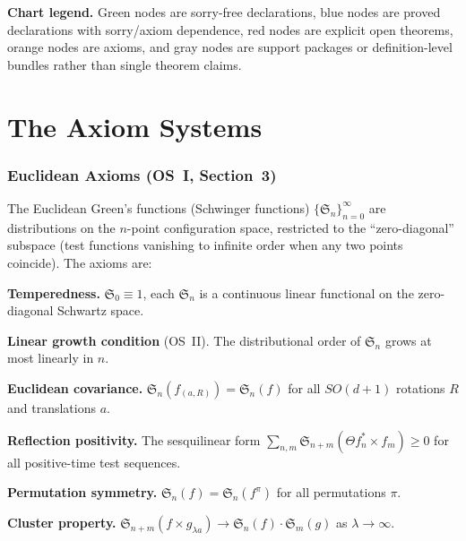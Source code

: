 \documentclass[11pt,a4paper]{article}
\begin{document}
\noindent
\textbf{Chart legend.} Green nodes are sorry-free declarations, blue nodes are
proved declarations with sorry/axiom dependence, red nodes are explicit open
theorems, orange nodes are axioms, and gray nodes are support packages or
definition-level bundles rather than single theorem claims.


\part{The Axiom Systems}

\section{Euclidean Axioms (OS~I, Section~3)}

The Euclidean Green's functions (Schwinger functions) $\{\mathfrak{S}_n\}_{n=0}^\infty$
are distributions on the $n$-point configuration space, restricted to the
``zero-diagonal'' subspace (test functions vanishing to infinite order when any two
points coincide). The axioms are:

\begin{description}[leftmargin=2cm]
\item[(E0)] \textbf{Temperedness.}
  $\mathfrak{S}_0 \equiv 1$, each $\mathfrak{S}_n$ is a continuous linear
  functional on the zero-diagonal Schwartz space.

\item[(E0')] \textbf{Linear growth condition} (OS~II).
  The distributional order of $\mathfrak{S}_n$ grows at most linearly in $n$.

\item[(E1)] \textbf{Euclidean covariance.}
  $\mathfrak{S}_n(f_{(a,R)}) = \mathfrak{S}_n(f)$ for all $SO(d{+}1)$ rotations
  $R$ and translations $a$.

\item[(E2)] \textbf{Reflection positivity.}
  The sesquilinear form
  $\sum_{n,m} \mathfrak{S}_{n+m}(\Theta f_n^* \times f_m) \geq 0$
  for all positive-time test sequences.

\item[(E3)] \textbf{Permutation symmetry.}
  $\mathfrak{S}_n(f) = \mathfrak{S}_n(f^\pi)$ for all permutations $\pi$.

\item[(E4)] \textbf{Cluster property.}
  $\mathfrak{S}_{n+m}(f \times g_{\lambda a}) \to
  \mathfrak{S}_n(f) \cdot \mathfrak{S}_m(g)$ as $\lambda \to \infty$.
\end{description}
\end{document}
